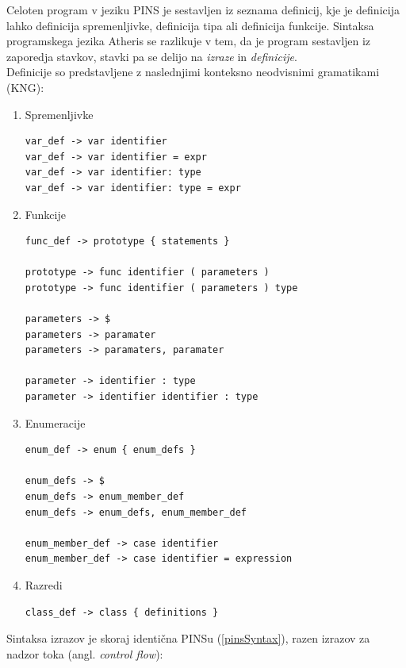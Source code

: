 \documentclass[a4paper, 12p]{book}
\begin{document}
Celoten program v jeziku PINS je sestavljen iz seznama definicij, kje je definicija lahko definicija spremenljivke, definicija tipa ali definicija funkcije. Sintaksa programskega jezika Atheris se razlikuje v tem, da je program sestavljen iz zaporedja stavkov, stavki pa se delijo na \textit{izraze} in \textit{definicije}. \\
\indent Definicije so predstavljene z naslednjimi konteksno neodvisnimi gramatikami (KNG):
 
\begin{enumerate}
	\item Spremenljivke
\begin{lstlisting}[]
var_def -> var identifier 
var_def -> var identifier = expr
var_def -> var identifier: type 
var_def -> var identifier: type = expr 
\end{lstlisting}
	\item Funkcije
\begin{lstlisting}[]
func_def -> prototype { statements }

prototype -> func identifier ( parameters )
prototype -> func identifier ( parameters ) type

parameters -> $
parameters -> paramater
parameters -> paramaters, paramater

parameter -> identifier : type
parameter -> identifier identifier : type
\end{lstlisting}	
	\item Enumeracije
	
\begin{lstlisting}
enum_def -> enum { enum_defs }

enum_defs -> $
enum_defs -> enum_member_def
enum_defs -> enum_defs, enum_member_def

enum_member_def -> case identifier
enum_member_def -> case identifier = expression
\end{lstlisting}
	\item Razredi
\begin{lstlisting}
class_def -> class { definitions }
\end{lstlisting}

\end{enumerate} 

Sintaksa izrazov je skoraj identična PINSu (\ref{pinsSyntax}), razen izrazov za nadzor toka (angl. \textit{control flow}):
\end{document}
